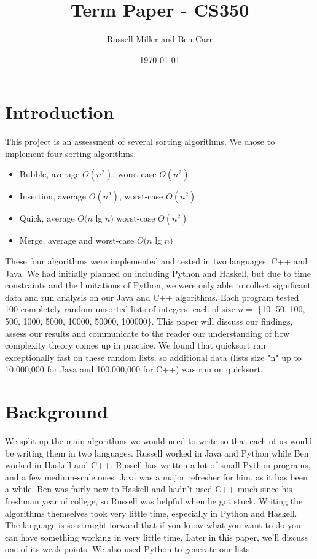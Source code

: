 \documentclass[12pt]{amsart}
\title{Term Paper - CS350}
\author{Russell Miller and Ben Carr}
\date{\today} %
\begin{document}
\maketitle

\section*{Introduction}

This project is an assessment of several sorting algorithms. We chose to implement four sorting algorithms: 
\begin{itemize}
\item Bubble, average  $O(n^2)$, worst-case $O(n^2)$
\item Insertion, average $O(n^2)$, worst-case $O(n^2)$
\item Quick, average $O(n$ lg $n)$ worst-case $O(n^2)$
\item Merge, average and worst-case $O(n$ lg $n)$
\end{itemize}
These four algorithms were implemented and tested in two languages: C++ and Java. We had initially planned on including Python and Haskell, but due to time constraints and the limitations of Python, we were only able to collect significant data and run analysis on our Java and C++ algorithms. Each program tested 100 completely random unsorted lists of integers, each of size $n = $ \{10, 50, 100, 500, 1000, 5000, 10000, 50000, 100000\}. This paper will discuss our findings, assess our results and communicate to the reader our understanding of how complexity theory comes up in practice. We found that quicksort ran exceptionally fast on these random lists, so additional data (lists size "n" up to 10,000,000 for Java and 100,000,000 for C++) was run on quicksort.\\
\section*{Background}

We split up the main algorithms we would need to write so that each of us would be
writing them in two languages. Russell worked in Java and Python while Ben worked in Haskell and C++. Russell has
written a lot of small Python programs, and a few medium-scale ones. Java was a
major refresher for him, as it has been a while. Ben was fairly new to Haskell and hadn't used C++ much since his freshman year of college, so Russell was helpful when he got stuck. Writing the algorithms themselves took very little time, especially in Python and Haskell. The language is so straight-forward that if you know what you want to do you can have something working in very little time. Later 
in this paper, we'll discuss one of its weak points. We also used Python to 
generate our lists. 
\end{document}
